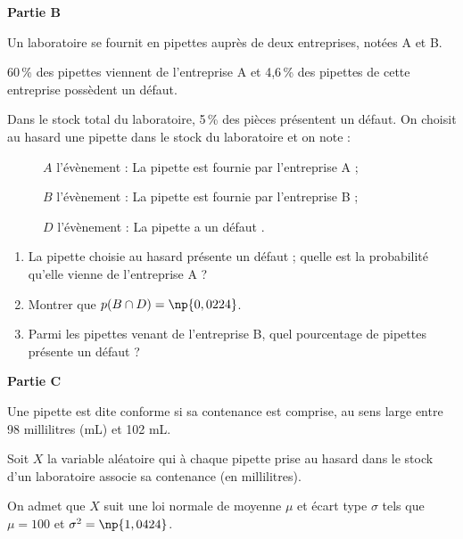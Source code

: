 \documentclass[10pt]{article}
\begin{document}
\bigskip

\textbf{Partie B}

\medskip
 
Un laboratoire se fournit en pipettes auprès de deux entreprises, notées A et B.
 
60\,\% des pipettes viennent de l'entreprise A et 4,6\,\% des pipettes de cette entreprise possèdent un défaut.
 
Dans le stock total du laboratoire, 5\,\% des pièces présentent un défaut. On choisit au hasard une pipette dans le stock du laboratoire et on note :

\setlength\parindent{8mm} 
\begin{description}
\item[ ] $A$ l'évènement : \og La pipette est fournie par l'entreprise A \fg{} ;
\item[ ] $B$ l'évènement : \og La pipette est fournie par l'entreprise B \fg{} ; 
\item[ ] $D$ l'évènement : \og La pipette a un défaut \fg.
\end{description}
\setlength\parindent{0mm} 

\medskip
 
\begin{enumerate}
\item La pipette choisie au hasard présente un défaut ; quelle est la probabilité qu'elle vienne de l'entreprise A ? 
\item Montrer que $p(B \cap D) = \np{0,0224}$. 
\item Parmi les pipettes venant de l'entreprise B, quel pourcentage de pipettes présente un défaut ? 
\end{enumerate}

\bigskip
 
\textbf{Partie C}

\medskip
 
Une pipette est dite conforme si sa contenance est comprise, au sens large entre 98 millilitres (mL) et 102 mL.
 
Soit $X$ la variable aléatoire qui à chaque pipette prise au hasard dans le stock d'un laboratoire associe sa contenance (en millilitres).

On admet que $X$ suit une loi normale  de moyenne $\mu$ et écart type $\sigma$ tels que $\mu = 100$ et $\sigma^2 = \np{1,0424}$.

\medskip
\end{document}
